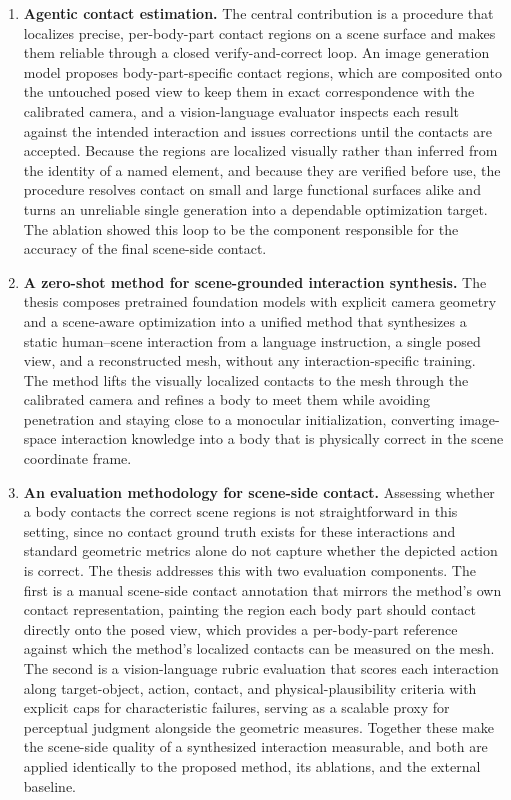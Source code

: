 \begin{enumerate}
  \item \textbf{Agentic contact estimation.} The central contribution is a procedure that localizes precise, per-body-part contact regions on a scene surface and makes them reliable through a closed verify-and-correct loop. An image generation model proposes body-part-specific contact regions, which are composited onto the untouched posed view to keep them in exact correspondence with the calibrated camera, and a vision-language evaluator inspects each result against the intended interaction and issues corrections until the contacts are accepted. Because the regions are localized visually rather than inferred from the identity of a named element, and because they are verified before use, the procedure resolves contact on small and large functional surfaces alike and turns an unreliable single generation into a dependable optimization target. The ablation showed this loop to be the component responsible for the accuracy of the final scene-side contact.

  \item \textbf{A zero-shot method for scene-grounded interaction synthesis.} The thesis composes pretrained foundation models with explicit camera geometry and a scene-aware optimization into a unified method that synthesizes a static human--scene interaction from a language instruction, a single posed view, and a reconstructed mesh, without any interaction-specific training. The method lifts the visually localized contacts to the mesh through the calibrated camera and refines a body to meet them while avoiding penetration and staying close to a monocular initialization, converting image-space interaction knowledge into a body that is physically correct in the scene coordinate frame.

  \item \textbf{An evaluation methodology for scene-side contact.} Assessing whether a body contacts the correct scene regions is not straightforward in this setting, since no contact ground truth exists for these interactions and standard geometric metrics alone do not capture whether the depicted action is correct. The thesis addresses this with two evaluation components. The first is a manual scene-side contact annotation that mirrors the method's own contact representation, painting the region each body part should contact directly onto the posed view, which provides a per-body-part reference against which the method's localized contacts can be measured on the mesh. The second is a vision-language rubric evaluation that scores each interaction along target-object, action, contact, and physical-plausibility criteria with explicit caps for characteristic failures, serving as a scalable proxy for perceptual judgment alongside the geometric measures. Together these make the scene-side quality of a synthesized interaction measurable, and both are applied identically to the proposed method, its ablations, and the external baseline.
\end{enumerate}

